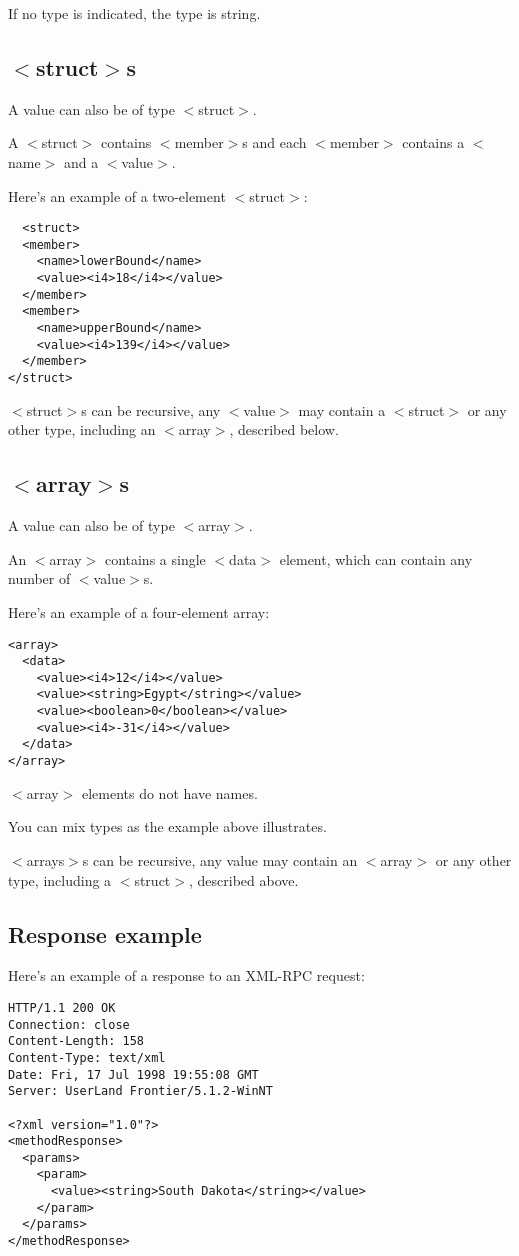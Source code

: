 \documentclass[10pt]{article}
\begin{document}
If no type is indicated, the type is string.

\subsection{$<$struct$>$s}

A value can also be of type $<$struct$>$.

A $<$struct$>$ contains $<$member$>$s and each $<$member$>$ contains a $<$name$>$ and a $<$value$>$.

Here's an example of a two-element $<$struct$>$:
\begin{verbatim}
  <struct>
  <member>
    <name>lowerBound</name>
    <value><i4>18</i4></value>
  </member>
  <member>
    <name>upperBound</name>
    <value><i4>139</i4></value>
  </member>
</struct>
\end{verbatim}

$<$struct$>$s can be recursive, any $<$value$>$ may contain a $<$struct$>$ or any other type, including an $<$array$>$, described below.
\subsection{$<$array$>$s}

A value can also be of type $<$array$>$.

An $<$array$>$ contains a single $<$data$>$ element, which can contain any number of $<$value$>$s.

Here's an example of a four-element array:
\begin{verbatim}
<array>
  <data>
    <value><i4>12</i4></value>
    <value><string>Egypt</string></value>
    <value><boolean>0</boolean></value>
    <value><i4>-31</i4></value>
  </data>
</array>
\end{verbatim}

$<$array$>$ elements do not have names.

You can mix types as the example above illustrates.

$<$arrays$>$s can be recursive, any value may contain an $<$array$>$ or any other type, including a $<$struct$>$, described above.
\subsection{Response example}

Here's an example of a response to an XML-RPC request:
\begin{verbatim}
HTTP/1.1 200 OK
Connection: close
Content-Length: 158
Content-Type: text/xml
Date: Fri, 17 Jul 1998 19:55:08 GMT
Server: UserLand Frontier/5.1.2-WinNT

<?xml version="1.0"?>
<methodResponse>
  <params>
    <param>
      <value><string>South Dakota</string></value>
    </param>
  </params>
</methodResponse>
\end{verbatim}
\end{document}
